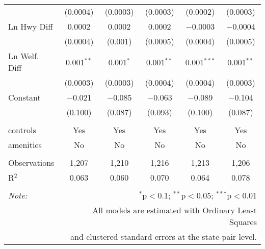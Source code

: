 \begin{table}[!htbp]
\begin{tabular}{@{\extracolsep{5pt}}lccccc}
  & (0.0004) & (0.0003) & (0.0003) & (0.0002) & (0.0003) \\ 
  Ln Hwy Diff & 0.0002 & 0.0002 & 0.0002 & $-$0.0003 & $-$0.0004 \\ 
  & (0.0004) & (0.001) & (0.0005) & (0.0004) & (0.0005) \\ 
  Ln Welf. Diff & 0.001$^{**}$ & 0.001$^{*}$ & 0.001$^{**}$ & 0.001$^{***}$ & 0.001$^{**}$ \\ 
  & (0.0003) & (0.0003) & (0.0004) & (0.0004) & (0.0003) \\ 
  Constant & $-$0.021 & $-$0.085 & $-$0.063 & $-$0.089 & $-$0.104 \\ 
  & (0.100) & (0.087) & (0.093) & (0.100) & (0.087) \\ 
 \hline \\[-1.8ex] 
controls & Yes & Yes & Yes & Yes & Yes \\ 
amenities & No & No & No & No & No \\ 
\hline \\[-1.8ex] 
Observations & 1,207 & 1,210 & 1,216 & 1,213 & 1,206 \\ 
R$^{2}$ & 0.063 & 0.060 & 0.070 & 0.064 & 0.078 \\ 
\hline 
\hline \\[-1.8ex] 
\textit{Note:}  & \multicolumn{5}{r}{$^{*}$p$<$0.1; $^{**}$p$<$0.05; $^{***}$p$<$0.01} \\ 
 & \multicolumn{5}{r}{All models are estimated with Ordinary Least Squares} \\ 
 & \multicolumn{5}{r}{and clustered standard errors at the state-pair level.} \\ 
\end{tabular} 
\end{table} 

